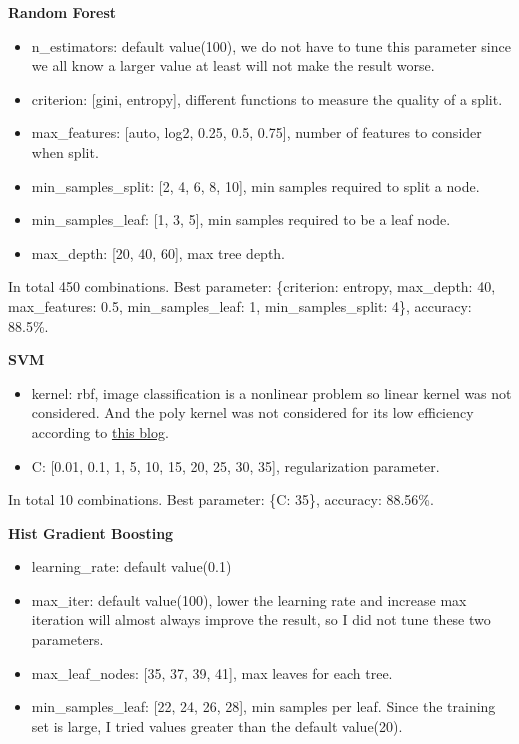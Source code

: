 \documentclass[12pt]{article}
\begin{document}
\textbf{Random Forest}
\begin{itemize}
    \item n\_estimators: default value(100), we do not have to tune this parameter since we all know a larger value at least will not make the result worse.
    \item criterion: [gini, entropy], different functions to measure the quality of a split.
    \item max\_features: [auto, log2, 0.25, 0.5, 0.75], number of features to consider when split.
    \item min\_samples\_split: [2, 4, 6, 8, 10], min samples required to split a node.
    \item min\_samples\_leaf: [1, 3, 5], min samples required to be a leaf node.
    \item max\_depth: [20, 40, 60], max tree depth.
\end{itemize}

In total 450 combinations. Best parameter: \{criterion: entropy, max\_depth: 40, max\_features: 0.5, min\_samples\_leaf: 1, min\_samples\_split: 4\}, accuracy: 88.5\%.

\textbf{SVM}
\begin{itemize}
    \item kernel: rbf, image classification is a nonlinear problem so linear kernel was not considered. And the poly kernel was not considered for its low efficiency according to \href{https://www.kdnuggets.com/2016/06/select-support-vector-machine-kernels.html}{this blog}.
    \item C: [0.01, 0.1, 1, 5, 10, 15, 20, 25, 30, 35], regularization parameter.
\end{itemize}

In total 10 combinations. Best parameter: \{C: 35\}, accuracy: 88.56\%.

\textbf{Hist Gradient Boosting}
\begin{itemize}
    \item learning\_rate: default value(0.1)
    \item max\_iter: default value(100), lower the learning rate and increase max iteration will almost always improve the result, so I did not tune these two parameters.
    \item max\_leaf\_nodes: [35, 37, 39, 41], max leaves for each tree.
    \item min\_samples\_leaf: [22, 24, 26, 28], min samples per leaf. Since the training set is large, I tried values greater than the default value(20).
\end{itemize}
\end{document}
